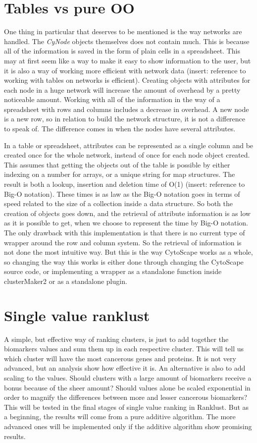 \section{Tables vs pure OO}
One thing in particular that deserves to be mentioned is the way networks are
handled. The \textit{CyNode} objects themselves does not contain much. This is
because all of the information is saved in the form of plain cells in a
spreadsheet. This may at first seem like a way to make it easy to show
information to the user, but it is also a way of working more efficient with
network data (insert: reference to working with tables on networks is
efficient). Creating objects with attributes for each node in a huge network
will increase the amount of overhead by a pretty noticeable amount. Working with
all of the information in the way of a spreadsheet with rows and columns
includes a decrease in overhead. A new node is a new row, so in relation to
build the network structure, it is not a difference to speak of.  The difference
comes in when the nodes have several attributes. 

In a table or spreadsheet, attributes can be represented as a single column and
be created once for the whole network, instead of once for each node object
created. This assumes that getting the objects out of the table is possible by
either indexing on a number for arrays, or a unique string for map structures.
The result is both a lookup, insertion and deletion time of O(1) (insert:
reference to Big-O notation).  These times is as law as the Big-O notation goes
in terms of speed related to the size of a collection inside a data structure.
So both the creation of objects goes down, and the retrieval of attribute
information is as low as it is possible to get, when we choose to represent the
time by Big-O notation. The only drawback with this implementation is that there
is no current type of wrapper around the row and column system. So the retrieval
of information is not done the most intuitive way. But this is the way CytoScape
works as a whole, so changing the way this works is either done through changing
the CytoScape source code, or implementing a wrapper as a standalone function
inside clusterMaker2 or as a standalone plugin.

\section{Single value ranklust}
A simple, but effective way of ranking clusters, is just to add together the
biomarkers values and sum them up in each respective cluster. This will tell us
which cluster will have the most cancerous genes and proteins. It is not very
advanced, but an analysis show how effective it is. An alternative is also to
add scaling to the values. Should clusters with a large amount of biomarkers
receive a bonus because of the sheer amount? Should values alone be scaled
exponential in order to magnify the differences between more and lesser
cancerous biomarkers? This will be tested in the final stages of single value
ranking in Ranklust. But as a beginning, the results will come from a pure
additive algorithm.  The more advanced ones will be implemented only if the
additive algorithm show promising results.

